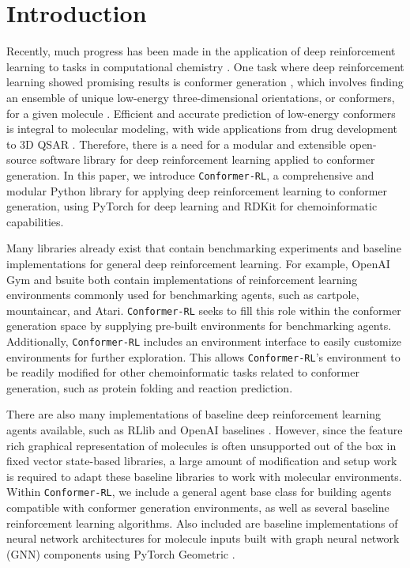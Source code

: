 \documentclass[twoside,11pt]{article}
\newcommand{\code}[1]{\texttt{#1}}
\newcommand{\titleofpaper}{Conformer-RL}
\newcommand{\genComment}[2]{\ifnum\comments=1{\color{#1}{\textsf{\footnotesize #2}}}\fi}
\newcommand{\tarun}[1] {\genComment{blue}{[TG: #1]}}
\newcommand{\runxuan}[1]{\genComment{pink}{[RJ:#1]}}
\begin{document}
\section{Introduction}
Recently, much progress has been made in the application of deep reinforcement learning to tasks in computational chemistry \citep{li2018foldingzero,zhou2017reactions,simm2020moldesign}. One task where deep reinforcement learning showed promising results is conformer generation \citep{gogineni2020torsionnet}, which involves finding an ensemble of unique low-energy three-dimensional orientations, or conformers, for a given molecule \citep{ebejer2020confgen}. Efficient and accurate prediction of low-energy conformers is integral to molecular modeling, with wide applications from drug development to 3D QSAR \citep{cole2018confgen}. Therefore, there is a need for a modular and extensible open-source software library for deep reinforcement learning applied to conformer generation.
In this paper, we introduce \code{\titleofpaper}, a comprehensive and modular Python library for applying deep reinforcement learning to conformer generation, using PyTorch \citep{torch} for deep learning and RDKit for chemoinformatic capabilities.

Many libraries already exist that contain benchmarking experiments and baseline implementations for general deep reinforcement learning. For example, OpenAI Gym \citep{brockman2016gym} and bsuite \citep{osband2020bsuite} both contain implementations of reinforcement learning environments commonly used for benchmarking agents, such as cartpole, mountaincar, and Atari. \code{\titleofpaper} seeks to fill this role within the conformer generation space by supplying pre-built environments for benchmarking agents. Additionally, \code{\titleofpaper} includes an environment interface to easily customize environments for further exploration. This allows \code{\titleofpaper}'s environment to be readily modified for other chemoinformatic tasks related to conformer generation, such as protein folding and reaction prediction.

There are also many implementations of baseline deep reinforcement learning agents available, such as RLlib \citep{liang2018rllib} and OpenAI baselines \citep{dhariwal2018baselines}. However, since the feature rich graphical representation of molecules is often unsupported out of the box in fixed vector state-based libraries, a large amount of modification and setup work is required to adapt these baseline libraries to work with molecular environments. Within \code{\titleofpaper}, we include a general agent base class for building agents compatible with conformer generation environments, as well as several baseline reinforcement learning algorithms. Also included are baseline implementations of neural network architectures for molecule inputs built with graph neural network (GNN) components using PyTorch Geometric \citep{fey2019geometric}.
\end{document}

